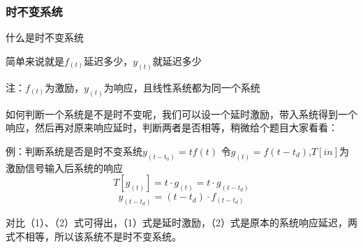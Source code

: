 \documentclass[UTF8,a4paper,12pt]{ctexart}
\begin{document}
  \subsubsection{时不变系统}
    \begin{titlebox}{什么是时不变系统}
      \begin{flushleft}
        简单来说就是$f_{(t)}$延迟多少，$y_{(t)}$就延迟多少
      \end{flushleft}
      \begin{flushleft}

        \par {\scriptsize 注：$f_{(t)}$为激励，$y_{(t)}$为响应，且线性系统都为同一个系统}
        \par 如何判断一个系统是不是时不变呢，我们可以设一个延时激励，带入系统得到一个响应，然后再对原来响应延时，判断两者是否相等，稍微给个题目大家看看：
        \begin{center}
           \par 例：判断系统是否是时不变系统$y_{(t-t_0)}=tf(t)$
           令$g_{(t)}=f(t-t_d)$,$T[in]$为激励信号输入后系统的响应
           \begin{equation}
            T[g_{(t)}] = t\cdot g_{(t)}=t\cdot g_{(t-t_d)}
            \end{equation}
            \begin{equation}
              y_{(t-t_d)}= (t-t_d) \cdot f_{(t-t_d)}
              \end{equation}
          \begin{flushleft}
              对比（1）、（2）式可得出，（1）式是延时激励，（2）式是原本的系统响应延迟，两式不相等，所以该系统不是时不变系统。  
          \end{flushleft}
           
        \end{center}
       
      \end{flushleft}
    \end{titlebox}
    
\end{document}
